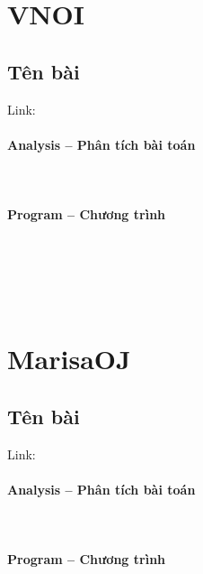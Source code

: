 \documentclass{article}
\begin{document}
\section{VNOI}

\subsection{Tên bài}
Link: \url{}


\paragraph{Analysis -- Phân tích bài toán} \mbox{} \\


\paragraph{Program -- Chương trình} \mbox{} \\


\begin{lstlisting}

	
\end{lstlisting}

\section{MarisaOJ}

\subsection{Tên bài}
Link: \url{}
 

\paragraph{Analysis -- Phân tích bài toán} \mbox{} \\


\paragraph{Program -- Chương trình} \mbox{} \\


\begin{lstlisting}

	
\end{lstlisting}
\end{document}
